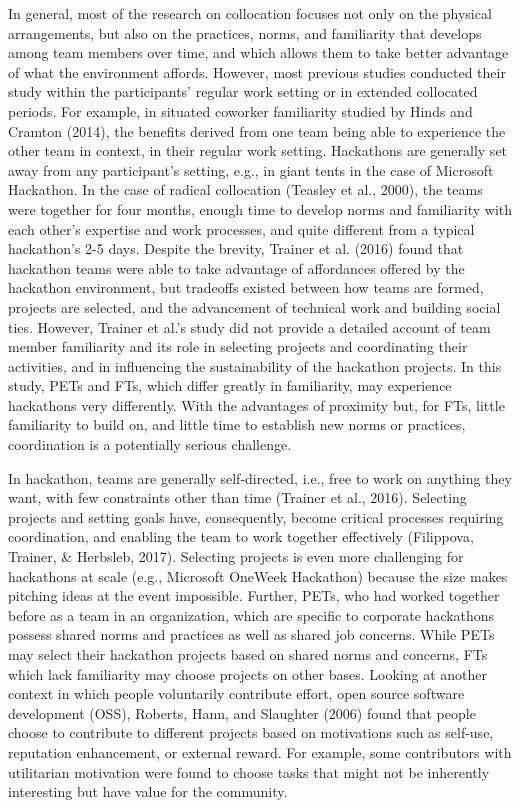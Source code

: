 \documentclass{hcij}
\begin{document}
In general, most of the research on collocation focuses not only on the physical arrangements, but also on the practices, norms, and familiarity that develops among team members over time, and which allows them to take better advantage of what the environment affords. However, most previous studies conducted their study within the participants’ regular work setting or in extended collocated periods. For example, in situated coworker familiarity studied by Hinds and Cramton (2014), the benefits derived from one team being able to experience the other team in context, in their regular work setting. Hackathons are generally set away from any participant’s setting, e.g., in giant tents in the case of Microsoft Hackathon. In the case of radical collocation (Teasley et al., 2000), the teams were together for four months, enough time to develop norms and familiarity with each other’s expertise and work processes, and quite different from a typical hackathon’s 2-5 days. Despite the brevity, Trainer et al. (2016) found that hackathon teams were able to take advantage of affordances offered by the hackathon environment, but tradeoffs existed between how teams are formed, projects are selected, and the advancement of technical work and building social ties. However, Trainer et al.’s study did not provide a detailed account of team member familiarity and its role in selecting projects and coordinating their activities, and in influencing the sustainability of the hackathon projects. In this study, PETs and FTs, which differ greatly in familiarity, may experience hackathons very differently. With the advantages of proximity but, for FTs, little familiarity to build on, and little time to establish new norms or practices, coordination is a potentially serious challenge.

In hackathon, teams are generally self-directed, i.e., free to work on anything they want, with few constraints other than time (Trainer et al., 2016). Selecting projects and setting goals have, consequently, become critical processes requiring coordination, and enabling the team to work together effectively (Filippova, Trainer, & Herbsleb, 2017). Selecting projects is even more challenging for hackathons at scale (e.g., Microsoft OneWeek Hackathon) because the size makes pitching ideas at the event impossible. Further, PETs, who had worked together before as a team in an organization, which are specific to corporate hackathons possess shared norms and practices as well as shared job concerns. While PETs may select their hackathon projects based on shared norms and concerns, FTs which lack familiarity may choose projects on other bases. Looking at another context in which people voluntarily contribute effort, open source software development (OSS), Roberts, Hann, and Slaughter (2006) found that people choose to contribute to different projects based on motivations such as self-use, reputation enhancement, or external reward. For example, some contributors with utilitarian motivation were found to choose tasks that might not be inherently interesting but have value for the community.
\end{document}
